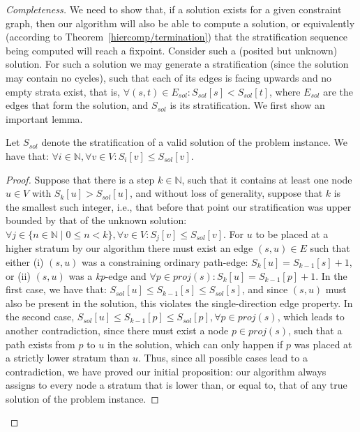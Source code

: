 \begin{proof}[Completeness]
  We need to show that, if a solution exists for a given constraint
  graph, then our algorithm will also be able to compute a solution,
  or equivalently (according to Theorem~\ref{hiercomp/termination}) that the
  stratification sequence being computed will reach a fixpoint.
  Consider such a (posited but unknown) solution. For such a solution
  we may generate a stratification (since the solution may contain no
  cycles), such that each of its edges is facing upwards and no empty
  strata exist, that is, $\forall (s,t) \in E_{sol} : S_{sol}[s] <
  S_{sol}[t]$, where $E_{sol}$ are the edges that form the solution,
  and $S_{sol}$ is its stratification.  We first show an important
  lemma.


  \begin{lem}\label{hiercomp/lemma:minheight}
    Let $S_{sol}$ denote the stratification of a valid solution of the
    problem instance. We have that: $\forall i \in \mathbb{N}, \forall
    v \in V : S_{i}[v] \leq S_{sol}[v]$.
  \end{lem}

  \begin{proof}
    Suppose that there is a step $k \in \mathbb{N}$, such that
    it contains at least one node $u \in V$ with $S_k[u] > S_{sol}[u]$,
    and without loss of generality, suppose that $k$ is the smallest
    such integer, i.e., that before that point our stratification
    was upper bounded by that of the unknown solution:
    $\forall j \in \{n \in \mathbb{N} \;|\; 0 \leq n < k \}, \forall v
    \in V : S_j[v] \leq S_{sol}[v]$. For $u$ to be placed at a higher
    stratum by our algorithm there must exist an edge $(s,u) \in E $
    such that either (i) $(s,u)$ was a constraining ordinary
    path-edge: $S_k[u] = S_{k-1}[s] + 1$, or (ii) $(s,u)$ was a
    \emph{kp}-edge and $\forall p \in \textit{proj}(s) : S_k[u] =
    S_{k-1}[p] + 1$. In the first case, we have that: $S_{sol}[u] \leq
    S_{k-1}[s] \leq S_{sol}[s]$, and since $(s,u)$ must also be
    present in the solution, this violates the single-direction edge
    property. In the second case, $S_{sol}[u] \leq S_{k-1}[p] \leq
    S_{sol}[p], \forall p \in \textit{proj}(s)$, which leads to
    another contradiction, since there must exist a node $p \in
    \textit{proj}(s)$, such that a path exists from $p$ to $u$ in the
    solution, which can only happen if $p$ was placed at a strictly
    lower stratum than $u$. Thus, since all possible cases lead to a
    contradiction, we have proved our initial proposition: our
    algorithm always assigns to every node a stratum that is lower
    than, or equal to, that of any true solution of the problem
    instance.
  \end{proof}


\end{proof}
